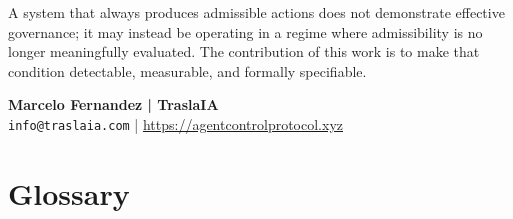 \documentclass[11pt]{article}
\theoremstyle{definition}
\begin{document}
A system that always produces admissible actions does not demonstrate effective governance;
it may instead be operating in a regime where admissibility is no longer meaningfully evaluated.
The contribution of this work is to make that condition detectable, measurable, and formally specifiable.

\bigskip
\noindent\textbf{Marcelo Fernandez | TraslaIA}\\
\texttt{info@traslaia.com} | \url{https://agentcontrolprotocol.xyz}~\cite{acp-website}

\appendix
\section{Glossary}
\end{document}
